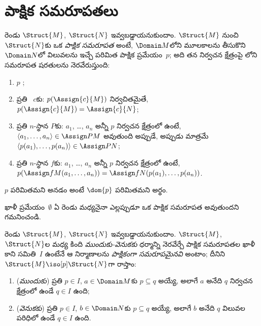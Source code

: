 \documentclass[../../../include/open-logic-section]{subfiles}
\begin{document}
\section{పాక్షిక సమరూపతలు}

\begin{defn}
  రెండు  $\Struct{M}$, $\Struct{N}$
  ఇవ్వబడ్డాయనుకుందాం. $\Struct{M}$ నుంచి $\Struct{N}$కు ఒక
  \emph{పాక్షిక సమరూపత} అంటే, $\Domain M$లోని మూలకాలను తీసుకొని
  $\Domain N$లో విలువలను ఇచ్చే పరిమిత పాక్షిక ప్రమేయం~$p$; అది తన
  నిర్వచన క్షేత్రంపై లోని సమరూపత
  షరతులను నెరవేరుస్తుంది:
  \begin{enumerate}
  \item $p$ ;
  \item ప్రతి ~$c$కు:
    $p(\Assign{c}{M})$ నిర్వచితమైతే,
    $p(\Assign{c}{M})=\Assign{c}{N}$;
  \item ప్రతి $n$-స్థాన  $P$కు:
    $a_1$, \dots, $a_n$ అన్నీ $p$ నిర్వచన క్షేత్రంలో ఉంటే,
    $\langle a_1, \dots, a_n\rangle \in \Assign P M$ అవుతుంది అప్పుడే, అప్పుడు మాత్రమే
    $\langle p(a_1), \dots, p(a_n)\rangle \in \Assign P N$;
  \item ప్రతి $n$-స్థాన  $f$కు:
    $a_1$, \dots, $a_n$ అన్నీ $p$ నిర్వచన క్షేత్రంలో ఉంటే,
    $p(\Assign f M(a_1, \dots,a_n))
    =\Assign f N(p(a_1), \dots,p(a_n))$.
  \end{enumerate}
  $p$ పరిమితమని అనడం అంటే $\dom{p}$ పరిమితమని అర్థం.
\end{defn}

ఖాళీ ప్రమేయం~$\emptyset$ ఏ రెండు  మధ్యనైనా
ఎల్లప్పుడూ ఒక పాక్షిక సమరూపత అవుతుందని గమనించండి.

\begin{defn}
  రెండు  $\Struct{M}$, $\Struct{N}$
  ఇవ్వబడ్డాయనుకుందాం. $\Struct{M}$, $\Struct{N}$ల మధ్య కింది
  \emph{ముందుకు-వెనుకకు} ధర్మాన్ని నెరవేర్చే పాక్షిక సమరూపతల ఖాళీ
  కాని సమితి~$I$ ఉంటేనే ఆ నిర్మాణాలను
  \emph{పాక్షికంగా సమరూపమైనవి} అంటాం; దీనిని $\Struct{M} \iso[p]
  \Struct{N}$గా రాస్తాం:
  \begin{enumerate}
  \item (\emph{ముందుకు}) ప్రతి $p \in I$, $a \in \Domain M$కు
    $p \subseteq q$ అయ్యే, అలాగే $a$ అనేది $q$ నిర్వచన క్షేత్రంలో
    ఉండే $q \in I$ ఉంది;
  \item (\emph{వెనుకకు}) ప్రతి $p \in I$, $b \in \Domain N$కు
    $p \subseteq q$ అయ్యే, అలాగే $b$ అనేది $q$ విలువల పరిధిలో
    ఉండే $q \in I$ ఉంది.
  \end{enumerate}
\end{defn}
\end{document}
